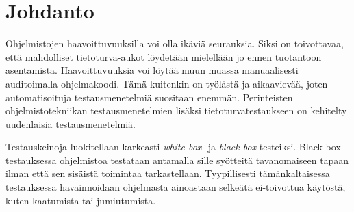 \section{Johdanto}

Ohjelmistojen haavoittuvuuksilla voi olla ikäviä seurauksia.
Siksi on toivottavaa, että mahdolliset tietoturva-aukot löydetään mielellään jo ennen tuotantoon asentamista.
Haavoittuvuuksia voi löytää muun muassa manuaalisesti auditoimalla ohjelmakoodi.
Tämä kuitenkin on työlästä ja aikaavievää, joten automatisoituja testausmenetelmiä suositaan enemmän.
Perinteisten ohjelmistotekniikan testausmenetelmien lisäksi tietoturvatestaukseen on kehitelty uudenlaisia testausmenetelmiä.


Testauskeinoja luokitellaan karkeasti \emph{white box}- ja \emph{black box}-testeiksi.
Black box-testauksessa ohjelmistoa testataan antamalla sille syötteitä tavanomaiseen tapaan ilman että sen sisäistä toimintaa tarkastellaan.
Tyypillisesti tämänkaltaisessa testauksessa havainnoidaan ohjelmasta ainoastaan selkeätä ei-toivottua käytöstä, kuten kaatumista tai jumiutumista.

